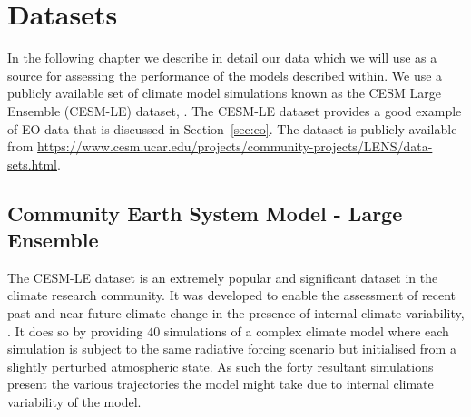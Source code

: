 

\chapter{Datasets\label{cha:data}}  %

\ifpdf
    \graphicspath{{Chapter2/Figs/Raster/}{Chapter2/Figs/PDF/}{Chapter2/Figs/}}
\else
    \graphicspath{{Chapter2/Figs/Vector/}{Chapter2/Figs/}}
\fi

In the following chapter we describe in detail our data which we will use as a source for assessing the performance of the models described within.
We use a publicly available set of climate model simulations known as the CESM Large Ensemble (CESM-LE) dataset, \citep{kay_community_2015}.
The CESM-LE dataset provides a good example of EO data that is discussed in Section~\ref{sec:eo}. The dataset is publicly available from \url{https://www.cesm.ucar.edu/projects/community-projects/LENS/data-sets.html}.

 \section[CESM-LE]{\label{sec:cesmle}Community Earth System Model - Large Ensemble}
 The CESM-LE dataset is an extremely popular and significant dataset in the climate research community.
 It was developed to enable the assessment of recent past and near future climate change in the presence of internal climate variability, \citep{kay_community_2015}.
 It does so by providing $40$ simulations of a complex climate model where each simulation is subject to the same radiative forcing scenario but initialised from a slightly perturbed atmospheric state.
 As such the forty resultant simulations present the various trajectories the model might take due to internal climate variability of the model. 
 
